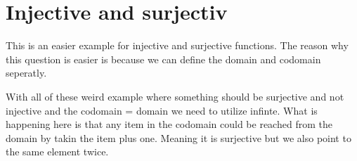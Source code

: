 \documentclass[a5paper]{article}
\begin{document}
\newpage
\section*{Injective and surjectiv}
This is an easier example for injective and surjective functions.
The reason why this question is easier is because we can define the domain and codomain seperatly.
\begin{figure}[ht]
	\centering
\end{figure}

With all of these weird example where something should be surjective and not injective and the codomain = domain we need to utilize infinte.
What is happening here is that any item in the codomain could be reached from the domain by takin the item plus one.
Meaning it is surjective but we also point to the same element twice.
\begin{figure}[ht]
	\centering
\end{figure}
\begin{figure}[ht]
	\centering
\end{figure}
\end{document}
